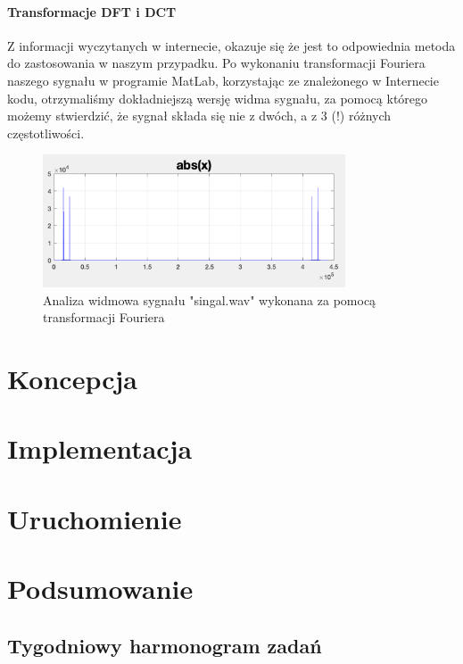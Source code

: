 \documentclass[a4paper,titleauthor]{mwart}
\begin{document}
\paragraph{Transformacje DFT i DCT} Z informacji wyczytanych w internecie, okazuje się że jest to odpowiednia metoda do zastosowania w naszym przypadku. Po wykonaniu transformacji Fouriera naszego sygnału w programie MatLab, korzystając ze znależonego w Internecie kodu, otrzymaliśmy dokładniejszą wersję widma sygnału, za pomocą którego możemy stwierdzić, że sygnał składa się nie z dwóch, a z 3 (!) różnych częstotliwości.

\begin{figure}[h]
	\centering
	\includegraphics[width=0.8\textwidth]{widmo_F}
	\caption{Analiza widmowa sygnału "singal.wav" wykonana za pomocą transformacji Fouriera}
\end{figure}

\section{Koncepcja}
\label{sec:koncepcja}

\section{Implementacja}
\label{sec:implementacja}


\section{Uruchomienie}
\label{sec:uruchomienie}


\section{Podsumowanie}
\label{sec:podsumowanie}

\subsection{Tygodniowy harmonogram zadań}
\end{document}
